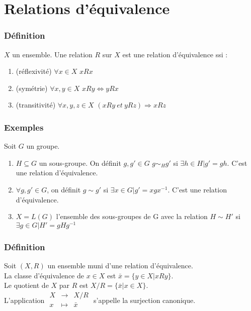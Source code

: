 \documentclass[a4paper, oneside]{report}
\begin{document}
\section{Relations d'équivalence}

\subsubsection{Définition}
$X$ un ensemble. Une relation $R$ sur $X$ est une relation d'équivalence ssi :
\begin{enumerate}
\item (réflexivité) $\forall x\in X$ $xRx$
\item (symétrie) $\forall x,y\in X$ $xRy\Leftrightarrow yRx$
\item (transitivité) $\forall x,y,z\in X$ $(xRy~et~yRz)\Rightarrow xRz$
\end{enumerate}

\subsubsection{Exemples}
Soit $G$ un groupe.
\begin{enumerate}
\item $H\subseteq G$ un sous-groupe. On définit $g,g'\in G$ $g\sim_Hg'$ si $\exists h\in H | g'=gh$. C'est une relation d'équivalence.
\item $\forall g,g'\in G$, on définit $g\sim g'$ si $\exists x\in G | g'=xgx^{-1}$. C'est une relation d'équivalence.
\item $X=L(G)$ l'ensemble des sous-groupes de G avec la relation $H\sim H'$ si $\exists g\in G | H'=gHg^{-1}$
\end{enumerate}

\subsubsection{Définition}
Soit $(X,R)$ un ensemble muni d'une relation d'équivalence.\\
La classe d'équivalence de $x\in X$ est $\bar{x}=\{y\in X | xRy \}$.\\
Le quotient de $X$ par $R$ est $X/R=\{\bar{x} | x\in X \}$.\\
L'application $\begin{array}{lll}
X&\rightarrow& X/R\\
x&\mapsto&\bar{x}\\
\end{array}$ s'appelle la surjection canonique.
\end{document}
